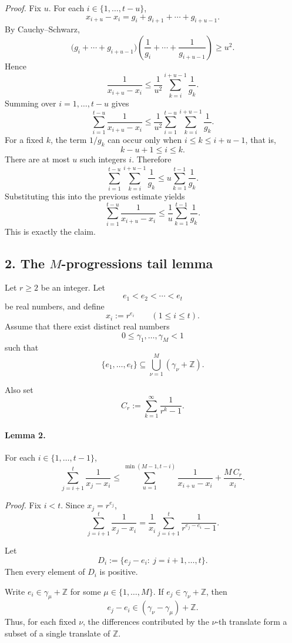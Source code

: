 \emph{Proof.}
Fix \(u\). For each \(i\in\{1,\dots,t-u\}\),
\[
x_{i+u}-x_i=g_i+g_{i+1}+\cdots+g_{i+u-1}.
\]
By Cauchy--Schwarz,
\[
\bigl(g_i+\cdots+g_{i+u-1}\bigr)\left(\frac1{g_i}+\cdots+\frac1{g_{i+u-1}}\right)\geq u^2.
\]
Hence
\[
\frac{1}{x_{i+u}-x_i}
\leq
\frac1{u^2}\sum_{k=i}^{i+u-1}\frac1{g_k}.
\]
Summing over \(i=1,\dots,t-u\) gives
\[
\sum_{i=1}^{t-u}\frac{1}{x_{i+u}-x_i}
\leq
\frac1{u^2}\sum_{i=1}^{t-u}\sum_{k=i}^{i+u-1}\frac1{g_k}.
\]
For a fixed \(k\), the term \(1/g_k\) can occur only when \(i\leq k\leq i+u-1\), that is,
\[
k-u+1\leq i\leq k.
\]
There are at most \(u\) such integers \(i\). Therefore
\[
\sum_{i=1}^{t-u}\sum_{k=i}^{i+u-1}\frac1{g_k}
\leq
u\sum_{k=1}^{t-1}\frac1{g_k}.
\]
Substituting this into the previous estimate yields
\[
\sum_{i=1}^{t-u}\frac{1}{x_{i+u}-x_i}
\leq
\frac1u\sum_{k=1}^{t-1}\frac1{g_k}.
\]
This is exactly the claim.

\subsection*{2. The \(M\)-progressions tail lemma}

Let \(r\geq 2\) be an integer. Let
\[
e_1<e_2<\cdots<e_t
\]
be real numbers, and define
\[
x_i:=r^{e_i}\qquad (1\leq i\leq t).
\]
Assume that there exist distinct real numbers
\[
0\leq \gamma_1,\dots,\gamma_M<1
\]
such that
\[
\{e_1,\dots,e_t\}\subseteq \bigcup_{\nu=1}^{M}(\gamma_\nu+\mathbb Z).
\]

Also set
\[
C_r:=\sum_{k=1}^{\infty}\frac{1}{r^k-1}.
\]

\paragraph{Lemma 2.}
For each \(i\in\{1,\dots,t-1\}\),
\[
\sum_{j=i+1}^{t}\frac{1}{x_j-x_i}
\leq
\sum_{u=1}^{\min(M-1,t-i)}\frac{1}{x_{i+u}-x_i}
+\frac{M\,C_r}{x_i}.
\]

\emph{Proof.}
Fix \(i<t\). Since \(x_j=r^{e_j}\),
\[
\sum_{j=i+1}^{t}\frac{1}{x_j-x_i}
=
\frac{1}{x_i}\sum_{j=i+1}^{t}\frac{1}{r^{e_j-e_i}-1}.
\tag{2.1}
\]

Let
\[
D_i:=\{e_j-e_i:\ j=i+1,\dots,t\}.
\]
Then every element of \(D_i\) is positive.

Write \(e_i\in \gamma_\mu+\mathbb Z\) for some \(\mu\in\{1,\dots,M\}\). If \(e_j\in \gamma_\nu+\mathbb Z\), then
\[
e_j-e_i\in (\gamma_\nu-\gamma_\mu)+\mathbb Z.
\]
Thus, for each fixed \(\nu\), the differences contributed by the \(\nu\)-th translate form a subset of a single translate of \(\mathbb Z\).

